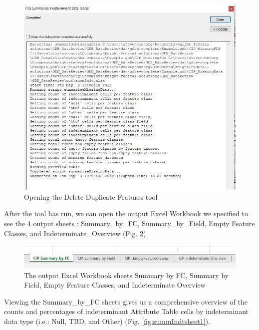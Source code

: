 \documentclass[openany]{book}
\theoremstyle{definition}
\theoremstyle{definition}
\theoremstyle{definition}
\theoremstyle{remark}
\begin{document}
\begin{figure}[H]

{\centering \includegraphics{figures/summIndt-messages} 

}

\caption{Opening the Delete Duplicate Features tool}\label{fig:summIndtmessages}
\end{figure}

After the tool has run, we can open the output Excel Workbook we
specified to see the 4 output sheets : Summary\_by\_FC,
Summary\_by\_Field, Empty Feature Classes, and Indeterminate\_Overview
(Fig. \ref{fig:summIndtsheets}).

\begin{figure}[H]

{\centering \includegraphics{figures/summIndt-sheets} 

}

\caption{The output Excel Workbook sheets Summary by FC, Summary by Field, Empty Feature Classes, and Indeterminate Overview}\label{fig:summIndtsheets}
\end{figure}

Viewing the Summary\_by\_FC sheets gives us a comprehensive overview of
the counts and percentages of indeterminant Attribute Table cells by
indeterminant data type (i.e.: Null, TBD, and Other) (Fig.
\ref{fig:summIndtsheet1}).
\end{document}
